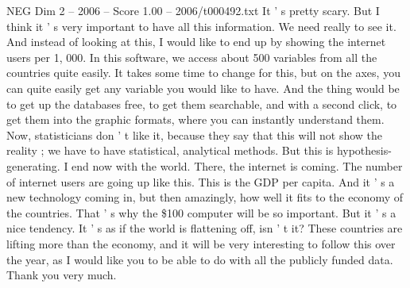 \begin{textsample}{NEG Dim 2 – 2006 – Score 1.00 – 2006/t000492.txt}
It ' s pretty scary.
But I think it ' s very important to have all this information.
We need really to see it.
And instead of looking at this, I would like to end up by showing the internet users per 1, 000.
In this software, we access about 500 variables from all the countries quite easily.
It takes some time to change for this, but on the axes, you can quite easily get any variable you would like to have.
And the thing would be to get up the databases free, to get them searchable, and with a second click, to get them into the graphic formats, where you can instantly understand them.
Now, statisticians don ' t like it, because they say that this will not show the reality ; we have to have statistical, analytical methods.
But this is hypothesis-generating.
I end now with the world.
There, the internet is coming.
The number of internet users are going up like this.
This is the GDP per capita.
And it ' s a new technology coming in, but then amazingly, how well it fits to the economy of the countries.
That ' s why the \$100 computer will be so important.
But it ' s a nice tendency.
It ' s as if the world is flattening off, isn ' t it?
These countries are lifting more than the economy, and it will be very interesting to follow this over the year, as I would like you to be able to do with all the publicly funded data.
Thank you very much.

\end{textsample}
